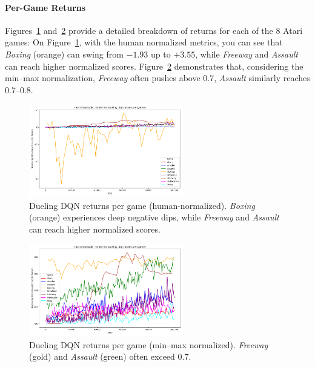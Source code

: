 \paragraph{Per-Game Returns}
Figures~\ref{fig:dueling_return_pergame_human} and~\ref{fig:dueling_return_pergame_minmax} 
provide a detailed breakdown of returns for each of the 8 Atari games:
On Figure~\ref{fig:dueling_return_pergame_human}, with the human normalized metrics, you can see that \emph{Boxing} (orange) can swing from $-1.93$ up to $+3.55$, while \emph{Freeway} and \emph{Assault} can reach higher normalized scores.
Figure~\ref{fig:dueling_return_pergame_minmax} demonstrates that, considering the min--max normalization, \emph{Freeway} often pushes above 0.7, \emph{Assault} similarly reaches 0.7--0.8.

\begin{figure}
	\centering
	\includegraphics[width=0.6\textwidth]{figures/dueling_dqn/charts_episodic_return_per_game_human_dueling_dqn_atari.png}
	\caption{Dueling DQN returns per game (human-normalized). 
		\emph{Boxing} (orange) experiences deep negative dips, while \emph{Freeway} and \emph{Assault} can reach higher normalized scores.}
	\label{fig:dueling_return_pergame_human}
\end{figure}

\begin{figure}
	\centering
	\includegraphics[width=0.6\textwidth]{figures/dueling_dqn/charts_episodic_return_per_game_minmax_dueling_dqn_atari.png}
	\caption{Dueling DQN returns per game (min--max normalized). 
		\emph{Freeway} (gold) and \emph{Assault} (green) often exceed 0.7.}
	\label{fig:dueling_return_pergame_minmax}
\end{figure}

